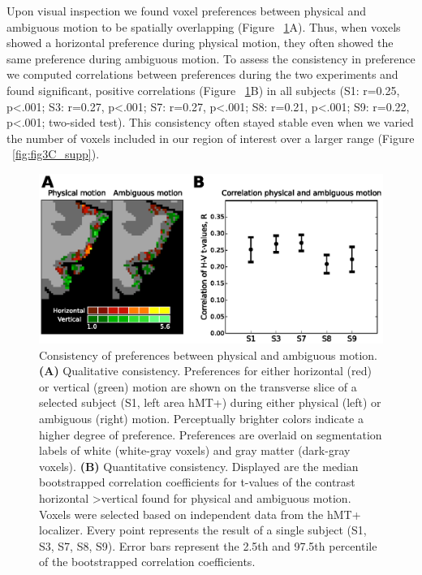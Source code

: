 Upon visual inspection we found voxel preferences between physical and ambiguous motion to be spatially overlapping (Figure ~\ref{fig:consistency}A). Thus, when voxels showed a horizontal preference during physical motion, they often showed the same preference during ambiguous motion. To assess the consistency in preference we computed correlations between preferences during the two experiments and found significant, positive correlations (Figure ~\ref{fig:consistency}B) in all subjects (S1: r=0.25, p\textless.001; S3: r=0.27, p\textless.001; S7: r=0.27, p\textless.001; S8: r=0.21, p\textless.001; S9: r=0.22, p\textless.001; two-sided test). This consistency often stayed stable even when we varied the number of voxels included in our region of interest over a larger range (Figure ~\ref{fig:fig3C_supp}).

\begin{figure}[htb!]
\centering
\includegraphics[width=\textwidth]{figures/chapter_03/fig3.eps}
\caption{Consistency of preferences between physical and ambiguous motion. \textbf{(A)} Qualitative consistency. Preferences for either horizontal (red) or vertical (green) motion are shown on the transverse slice of a selected subject (S1, left area hMT+) during either physical (left) or ambiguous (right) motion. Perceptually brighter colors indicate a higher degree of preference. Preferences are overlaid on segmentation labels of white (white-gray voxels) and gray matter (dark-gray voxels). \textbf{(B)} Quantitative consistency. Displayed are the median bootstrapped correlation coefficients for t-values of the contrast horizontal \textgreater vertical found for physical and ambiguous motion. Voxels were selected based on independent data from the hMT+ localizer. Every point represents the result of a single subject (S1, S3, S7, S8, S9). Error bars represent the 2.5th and 97.5th percentile of the bootstrapped correlation coefficients.}
\label{fig:consistency}
\end{figure}

